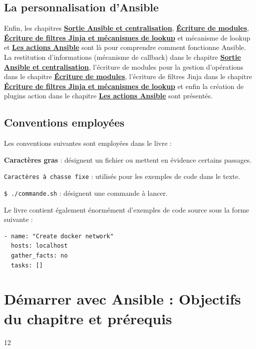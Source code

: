 \documentclass[hidelinks]{article}
\begin{document}
\subsection{La personnalisation d'Ansible}

Enfin, les chapitres \hyperref[sec:Sortie Ansible et centralisation]{\textbf{Sortie Ansible et centralisation}}, \hyperref[sec:Écriture de modules]{\textbf{Écriture de modules}}, \hyperref[sec:Écriture de filtres jinja et mécanismes de lookup]{\textbf{Écriture de filtres Jinja et mécanismes de lookup}} et mécanisme de lookup et \hyperref[sec:Les actions Ansible]{\textbf{Les actions Ansible}} sont là pour comprendre comment fonctionne Ansible. La restitution d'informations (mécanisme de callback) dans le chapitre \hyperref[sec:Sortie Ansible et centralisation]{\textbf{Sortie Ansible et centralisation}}, l'écriture de modules pour la gestion d'opérations dans le chapitre \hyperref[sec:Écriture de modules]{\textbf{Écriture de modules}}, l'écriture de filtres Jinja dans le chapitre \hyperref[sec:Écriture de filtres jinja et mécanismes de lookup]{\textbf{Écriture de filtres Jinja et mécanismes de lookup}} et enfin la création de plugins action dans le chapitre \hyperref[sec:Les actions Ansible]{\textbf{Les actions Ansible}} sont présentés.

\subsection{Conventions employées}
Les conventions suivantes sont employées dans le livre :

\textbf{Caractères gras} : désignent un fichier ou mettent en évidence certains passages.

\texttt{Caractères à chasse fixe} : utilisés pour les exemples de code dans le texte.

\texttt{\$ ./commande.sh} : désignent une commande à lancer.

Le livre contient également énormément d'exemples de code source sous la forme suivante :
\begin{verbatim}
- name: "Create docker network" 
  hosts: localhost 
  gather_facts: no 
  tasks: []
\end{verbatim}

\section{Démarrer avec Ansible : Objectifs du chapitre et prérequis}
\label{sec:Démarrer avec Ansible}
12
\end{document}
